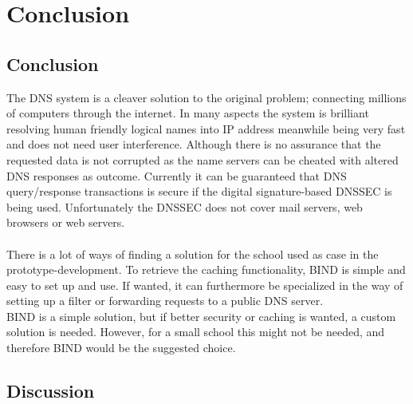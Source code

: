 \documentclass[Preamble]{subfiles}
\begin{document}
\chapter{Conclusion}

\section{Conclusion}

The DNS system is a cleaver solution to the original problem; connecting millions of computers through the internet.
In many aspects the system is brilliant resolving human friendly logical names into IP address meanwhile being very fast and does not need user interference. Although there is no assurance that the requested data is not corrupted as the name servers can be cheated with altered DNS responses as outcome. Currently it can be guaranteed that DNS query/response transactions is secure if the digital signature-based DNSSEC is being used. Unfortunately the DNSSEC does not cover mail servers, web browsers or web servers.
\\
\\
There is a lot of ways of finding a solution for the school used as case in the prototype-development.
To retrieve the caching functionality, BIND is simple and easy to set up and use. 
If wanted, it can furthermore be specialized in the way of setting up a filter or forwarding requests to a public DNS server.  
\\
BIND is a simple solution, but if better security or caching is wanted, a custom solution is needed. However, for a small school this might not be needed, and therefore BIND would be the suggested choice.


\section{Discussion}
\end{document}
